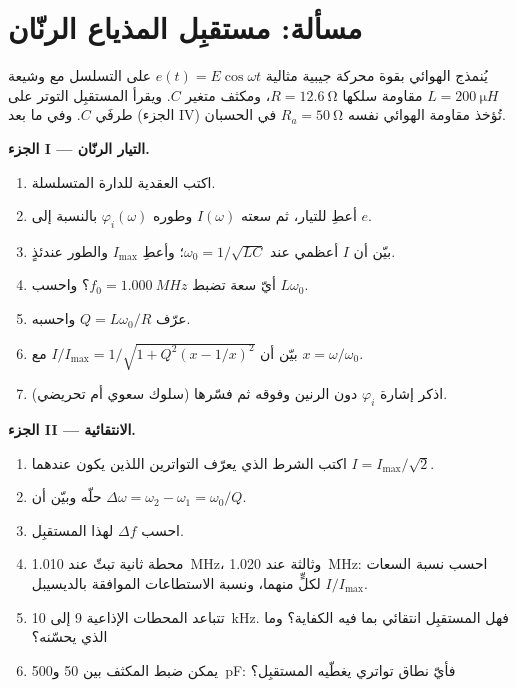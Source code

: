 \section{مسألة: مستقبِل المذياع الرنّان}

\begin{problem}
\label{pb:b1:sinusoidal-impedance:1}
يُنمذج الهوائي بقوة محركة جيبية مثالية $e(t) = E\cos\omega t$
على التسلسل مع وشيعة $L = \qty{200}{\micro H}$ مقاومة سلكها
$R = \qty{12.6}{\ohm}$، ومكثف متغير $C$. ويقرأ
المستقبِل التوتر على طرفَي $C$. وفي ما بعد (الجزء IV) تُؤخذ مقاومة الهوائي
نفسه $R_a = \qty{50}{\ohm}$ في الحسبان.

\medskip
\noindent\textbf{الجزء I --- التيار الرنّان.}
\begin{enumerate}
  \item اكتب  العقدية للدارة المتسلسلة.
  \item أعطِ  للتيار، ثم سعته
        $I(\omega)$ وطوره $\varphi_i(\omega)$ بالنسبة إلى $e$.
  \item بيّن أن $I$ أعظمي عند $\omega_0 = 1/\sqrt{LC}$؛ وأعطِ
        $I_{\max}$ والطور عندئذٍ.
  \item أيّ سعة تضبط $f_0 = \qty{1.000}{MHz}$؟ واحسب
        $L\omega_0$.
  \item عرّف $Q = L\omega_0/R$ واحسبه.
  \item بيّن أن $I/I_{\max} = 1/\sqrt{1 + Q^2(x - 1/x)^2}$ مع
        $x = \omega/\omega_0$.
  \item اذكر إشارة $\varphi_i$ دون الرنين وفوقه ثم
        فسّرها (سلوك سعوي أم تحريضي).
\end{enumerate}

\medskip
\noindent\textbf{الجزء II --- الانتقائية.}
\begin{enumerate}[resume]
  \item اكتب الشرط الذي يعرّف التواترين اللذين يكون عندهما
        $I = I_{\max}/\sqrt2$.
  \item حلّه وبيّن أن $\Delta\omega = \omega_2 - \omega_1 =
        \omega_0/Q$.
  \item احسب  $\Delta f$ لهذا المستقبِل.
  \item محطة ثانية تبثّ عند \qty{1.010}{MHz}، وثالثة عند
        \qty{1.020}{MHz}: احسب نسبة السعات $I/I_{\max}$ لكلٍّ
        منهما، ونسبة الاستطاعات الموافقة بالديسيبل.
  \item تتباعد المحطات الإذاعية \qty{9}{} إلى \qty{10}{kHz}. فهل
        المستقبِل انتقائي بما فيه الكفاية؟ وما الذي يحسّنه؟
  \item يمكن ضبط المكثف بين \qty{50}{} و\qty{500}{pF}:
        فأيّ نطاق تواتري يغطّيه المستقبِل؟
\end{enumerate}


\end{problem}

